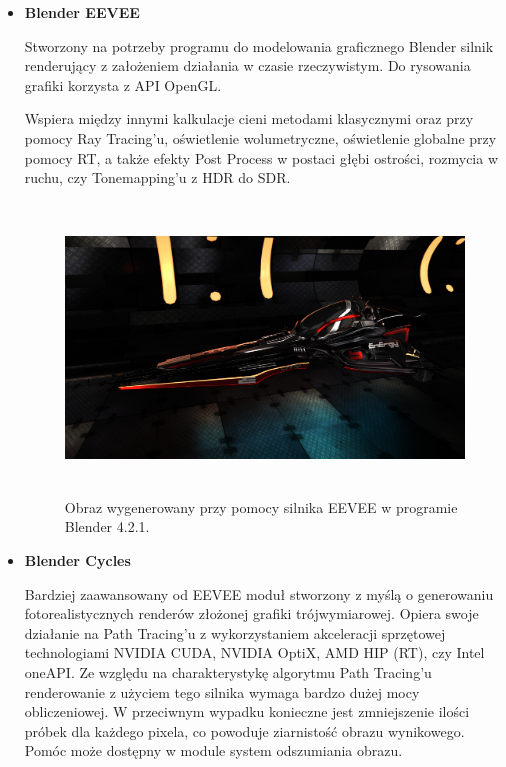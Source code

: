 \begin{itemize}
	\item \textbf{Blender EEVEE}

	Stworzony na potrzeby programu do modelowania graficznego Blender silnik renderujący z założeniem działania w czasie rzeczywistym. Do rysowania grafiki korzysta z API OpenGL.

	Wspiera między innymi kalkulacje cieni metodami klasycznymi oraz przy pomocy Ray Tracing'u, oświetlenie wolumetryczne, oświetlenie globalne przy pomocy RT, a także efekty Post Process w postaci głębi ostrości, rozmycia w ruchu, czy Tonemapping'u z HDR do SDR.

	\begin{figure}[htbp]
		\centering
		\includegraphics[width=5.41667in,height=3.03651in]{images/14_eevee.png}
		\caption{Obraz wygenerowany przy pomocy silnika EEVEE w programie Blender 4.2.1.}
	\end{figure}

	\item \textbf{Blender Cycles}

	Bardziej zaawansowany od EEVEE moduł stworzony z myślą o generowaniu fotorealistycznych renderów złożonej grafiki trójwymiarowej. Opiera swoje działanie na Path Tracing'u z wykorzystaniem akceleracji sprzętowej technologiami NVIDIA CUDA, NVIDIA OptiX, AMD HIP (RT), czy Intel oneAPI. Ze względu na charakterystykę algorytmu Path Tracing'u renderowanie z użyciem tego silnika wymaga bardzo dużej mocy obliczeniowej. W przeciwnym wypadku konieczne jest zmniejszenie ilości próbek dla każdego pixela, co powoduje ziarnistość obrazu wynikowego. Pomóc może dostępny w module system odszumiania obrazu.


\end{itemize}

